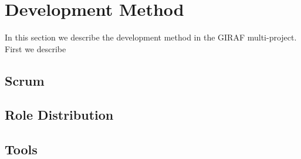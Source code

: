 \chapter{Development Method}
In this section we describe the development method in the GIRAF multi-project.
First we describe 




\section{Scrum}


\section{Role Distribution}


\section{Tools}